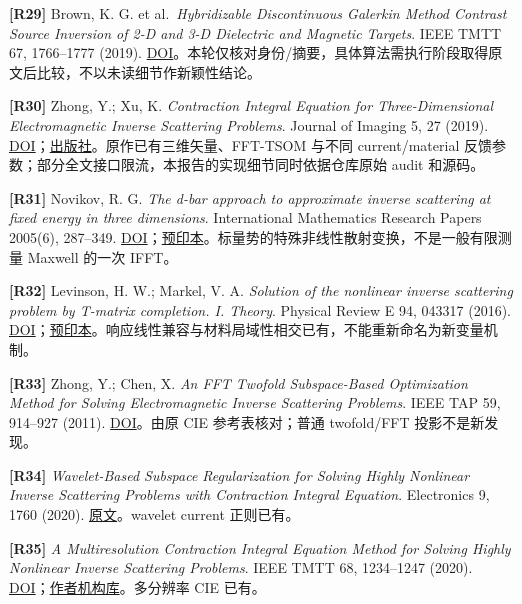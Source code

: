 \documentclass[11pt,a4paper]{article}
\begin{document}
\textbf{{[}R29{]}} Brown, K. G. et al.~\emph{Hybridizable Discontinuous
Galerkin Method Contrast Source Inversion of 2-D and 3-D Dielectric and
Magnetic Targets}. IEEE TMTT 67, 1766--1777 (2019).
\href{https://doi.org/10.1109/TMTT.2019.2905214}{DOI}。本轮仅核对身份/摘要，具体算法需执行阶段取得原文后比较，不以未读细节作新颖性结论。

\textbf{{[}R30{]}} Zhong, Y.; Xu, K. \emph{Contraction Integral Equation
for Three-Dimensional Electromagnetic Inverse Scattering Problems}.
Journal of Imaging 5, 27 (2019).
\href{https://doi.org/10.3390/jimaging5020027}{DOI}；\href{https://www.mdpi.com/2313-433X/5/2/27}{出版社}。原作已有三维矢量、FFT-TSOM
与不同 current/material
反馈参数；部分全文接口限流，本报告的实现细节同时依据仓库原始 audit
和源码。

\textbf{{[}R31{]}} Novikov, R. G. \emph{The d-bar approach to
approximate inverse scattering at fixed energy in three dimensions}.
International Mathematics Research Papers 2005(6), 287--349.
\href{https://doi.org/10.1155/IMRP.2005.287}{DOI}；\href{https://arxiv.org/abs/math-ph/0505033}{预印本}。标量势的特殊非线性散射变换，不是一般有限测量
Maxwell 的一次 IFFT。

\textbf{{[}R32{]}} Levinson, H. W.; Markel, V. A. \emph{Solution of the
nonlinear inverse scattering problem by T-matrix completion. I. Theory}.
Physical Review E 94, 043317 (2016).
\href{https://doi.org/10.1103/PhysRevE.94.043317}{DOI}；\href{https://arxiv.org/abs/1401.3319}{预印本}。响应线性兼容与材料局域性相交已有，不能重新命名为新变量机制。

\textbf{{[}R33{]}} Zhong, Y.; Chen, X. \emph{An FFT Twofold
Subspace-Based Optimization Method for Solving Electromagnetic Inverse
Scattering Problems}. IEEE TAP 59, 914--927 (2011).
\href{https://doi.org/10.1109/TAP.2010.2103027}{DOI}。由原 CIE
参考表核对；普通 twofold/FFT 投影不是新发现。

\textbf{{[}R34{]}} \emph{Wavelet-Based Subspace Regularization for
Solving Highly Nonlinear Inverse Scattering Problems with Contraction
Integral Equation}. Electronics 9, 1760 (2020).
\href{https://www.mdpi.com/2079-9292/9/11/1760}{原文}。wavelet current
正则已有。

\textbf{{[}R35{]}} \emph{A Multiresolution Contraction Integral Equation
Method for Solving Highly Nonlinear Inverse Scattering Problems}. IEEE
TMTT 68, 1234--1247 (2020).
\href{https://doi.org/10.1109/TMTT.2019.2956939}{DOI}；\href{https://iris.unitn.it/handle/11572/260153}{作者机构库}。多分辨率
CIE 已有。
\end{document}
